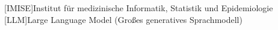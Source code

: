 \begin{acronym}[SPARQL]
[IMISE]{Institut für medizinische Informatik, Statistik und Epidemiologie}
[LLM]{Large Language Model (Großes generatives Sprachmodell)}
\end{acronym}
